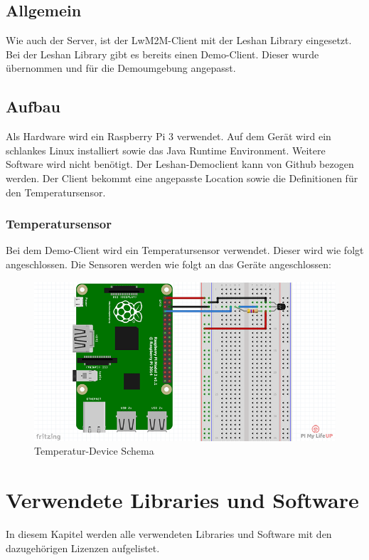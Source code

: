 \subsection{Allgemein}
Wie auch der Server, ist der LwM2M-Client mit der Leshan Library eingesetzt. Bei der Leshan Library gibt es bereits einen Demo-Client. Dieser wurde übernommen und für die Demoumgebung angepasst.
\subsection{Aufbau}
Als Hardware wird ein Raspberry Pi 3 verwendet. Auf dem Gerät wird ein schlankes Linux installiert sowie das Java Runtime Environment. Weitere Software wird nicht benötigt. Der Leshan-Democlient kann von Github bezogen werden. Der Client bekommt eine angepasste Location sowie die Definitionen für den Temperatursensor.
\subsubsection{Temperatursensor}
Bei dem Demo-Client wird ein Temperatursensor verwendet. Dieser wird wie folgt angeschlossen.
Die Sensoren werden wie folgt an das Geräte angeschlossen:
\begin{figure}[H]
\centering
\includegraphics[scale=0.5]{../04_Realisierung/images/sensorconnection.png}
\caption{Temperatur-Device Schema\cite{RaspBuild}}
\end{figure}

\newpage

\section{Verwendete Libraries und Software}
In diesem Kapitel werden alle verwendeten Libraries und Software mit den dazugehörigen Lizenzen aufgelistet.

